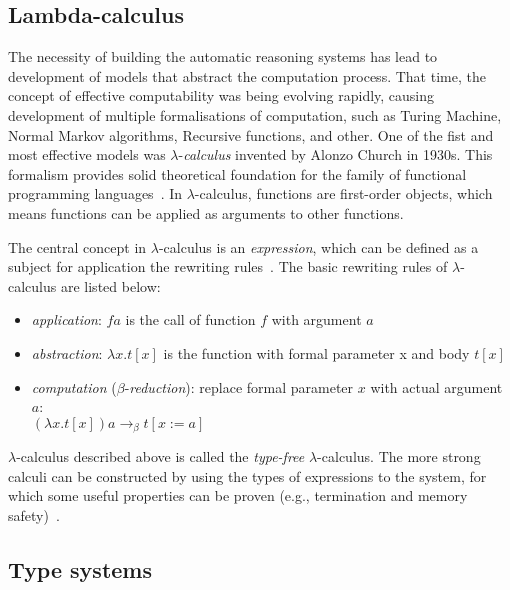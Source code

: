 \documentclass[article]{aaltoseries}
\begin{document}
\subsection{Lambda-calculus}
\label{sec:lambda}


The necessity of building the automatic reasoning systems has lead to development of models that abstract the computation process. That time, the concept of effective computability was being evolving rapidly, causing development of multiple formalisations of computation, such as Turing Machine, Normal Markov algorithms, Recursive functions, and other. One of the fist and most effective models was $\lambda$-\textit{calculus} invented by Alonzo Church in 1930s. This formalism provides solid theoretical foundation for the family of functional programming languages~\cite{Roj15}. In $\lambda$-calculus, functions are first-order objects, which means functions can be applied as arguments to other functions.

The central concept in $\lambda$-calculus is an \textit{expression}, which can be defined as a subject for application the rewriting rules~\cite{Bar88}. The basic rewriting rules of $\lambda$-calculus are listed below:

\begin{itemize}
\itemsep0em
	\item \textit{application}:
	$f a$ is the call of function $f$ with argument $a$
	
	\item \textit{abstraction}:
	$\lambda x.t[x]$ is the function with formal parameter x and body $t[x]$
	
	\item \textit{computation} ($\beta$-\textit{reduction}): replace formal parameter $x$ with actual argument $a$: \\
	$(\lambda x.t[x]) a \rightarrow_{\beta} t[x:=a]$
\end{itemize}

$\lambda$-calculus described above is called the \textit{type-free} $\lambda$-calculus. The more strong calculi can be constructed by using the types of expressions to the system, for which some useful properties can be proven (e.g., termination and memory safety)~\cite{Bar13}.

\subsection{Type systems}
\label{sec:type_systems}
\end{document}
